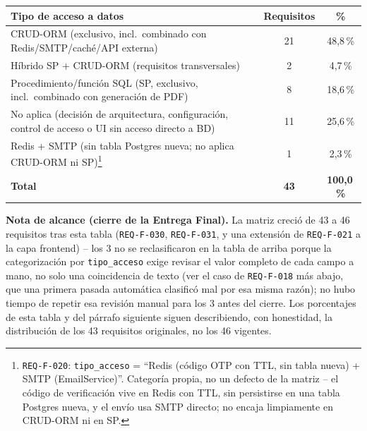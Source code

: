 \begin{center}
\begin{tabularx}{\linewidth}{|X|c|c|}
\hline
\rowcolor{verdeuteq}
\color{white}\textbf{Tipo de acceso a datos} & \color{white}\textbf{Requisitos} & \color{white}\textbf{\%} \\
\hline
CRUD-ORM (exclusivo, incl.\ combinado con Redis/SMTP/caché/API externa) & 21 & 48{,}8\,\% \\
\hline
Híbrido SP + CRUD-ORM (requisitos transversales) & 2 & 4{,}7\,\% \\
\hline
Procedimiento/función SQL (SP, exclusivo, incl.\ combinado con generación de PDF) & 8 & 18{,}6\,\% \\
\hline
No aplica (decisión de arquitectura, configuración, control de acceso o UI sin acceso directo a BD) & 11 & 25{,}6\,\% \\
\hline
Redis + SMTP (sin tabla Postgres nueva; no aplica CRUD-ORM ni SP)\footnote{\texttt{REQ-F-020}: \texttt{tipo\_acceso} = ``Redis (código OTP con TTL, sin tabla nueva) + SMTP (EmailService)''. Categoría propia, no un defecto de la matriz -- el código de verificación vive en Redis con TTL, sin persistirse en una tabla Postgres nueva, y el envío usa SMTP directo; no encaja limpiamente en CRUD-ORM ni en SP.} & 1 & 2{,}3\,\% \\
\hline
\textbf{Total} & \textbf{43} & \textbf{100{,}0\,\%} \\
\hline
\end{tabularx}
\end{center}

\textbf{Nota de alcance (cierre de la Entrega Final).} La matriz creció
de 43 a 46 requisitos tras esta tabla (\texttt{REQ-F-030},
\texttt{REQ-F-031}, y una extensión de \texttt{REQ-F-021} a la capa
frontend) -- los 3 no se reclasificaron en la tabla de arriba porque la
categorización por \texttt{tipo\_acceso} exige revisar el valor completo
de cada campo a mano, no solo una coincidencia de texto (ver el caso de
\texttt{REQ-F-018} más abajo, que una primera pasada automática
clasificó mal por esa misma razón); no hubo tiempo de repetir esa
revisión manual para los 3 antes del cierre. Los porcentajes de esta
tabla y del párrafo siguiente siguen describiendo, con honestidad, la
distribución de los 43 requisitos originales, no los 46 vigentes.

